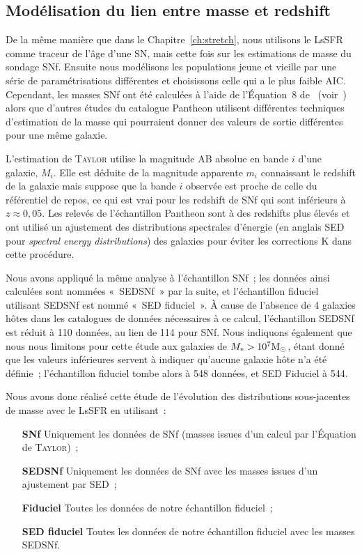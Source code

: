 \documentclass[../main/main.tex]{subfiles}
\begin{document}
\subsection{Modélisation du lien entre masse et redshift}\label{ssec:mmod}

De la même manière que dans le Chapitre~\ref{ch:stretch}, nous utilisons le
LsSFR comme traceur de l'âge d'une SN, mais cette fois sur les estimations de
masse du sondage SNf. Ensuite nous modélisons les populations jeune et vieille
par une série de paramétrisations différentes et choisissons celle qui a le plus
faible AIC. Cependant, les masses SNf ont été calculées à l'aide de l'Équation~8
de~\cite{taylor2011} (voir~\cite{rigault2020}) alors que d'autres études du
catalogue Pantheon utilisent différentes techniques d'estimation de la masse qui
pourraient donner des valeurs de sortie différentes pour une même galaxie.

L'estimation de \textsc{Taylor} utilise la magnitude AB absolue en bande $i$
d'une galaxie, $M_i$. Elle est déduite de la magnitude apparente $m_i$
connaissant le redshift de la galaxie mais suppose que la bande $i$ observée est
proche de celle du référentiel de repos, ce qui est vrai pour les redshift de
SNf qui sont inférieurs à $z\approx 0,05$. Les relevés de l'échantillon Pantheon
sont à des redshifts plus élevés et ont utilisé un ajustement des distributions
spectrales d'énergie (en anglais SED pour \textit{spectral energy
distributions}) des galaxies pour éviter les corrections K dans cette procédure.

Nous avons appliqué la même analyse à l'échantillon SNf~; les données ainsi
calculées sont nommées «~SEDSNf~» par la suite, et l'échantillon fiduciel
utilisant SEDSNf est nommé «~SED fiduciel~». À cause de l'absence de 4 galaxies
hôtes dans les catalogues de données nécessaires à ce calcul, l'échantillon
SEDSNf est réduit à 110 données, au lien de 114 pour SNf. Nous indiquons
également que nous nous limitons pour cette étude aux galaxies de $M_* >
10^7\si{\Msun}$, étant donné que les valeurs inférieures servent à indiquer
qu'aucune galaxie hôte n'a été définie~; l'échantillon fiduciel tombe alors à
548 données, et SED Fiduciel à 544.

Nous avons donc réalisé cette étude de l'évolution des distributions
sous-jacentes de masse avec le LsSFR en utilisant~:
\begin{enumerate}
    \item [\bfseries SNf] Uniquement les données de SNf (masses issues d'un
        calcul par l'Équation de \textsc{Taylor})~;
    \item [\bfseries SEDSNf] Uniquement les données de SNf avec les masses
        issues d'un ajustement par SED~;
    \item [\bfseries Fiduciel] Toutes les données de notre échantillon
        fiduciel~;
    \item [\bfseries SED fiduciel] Toutes les données de notre échantillon
        fiduciel avec les masses SEDSNf.
\end{enumerate}
\end{document}
